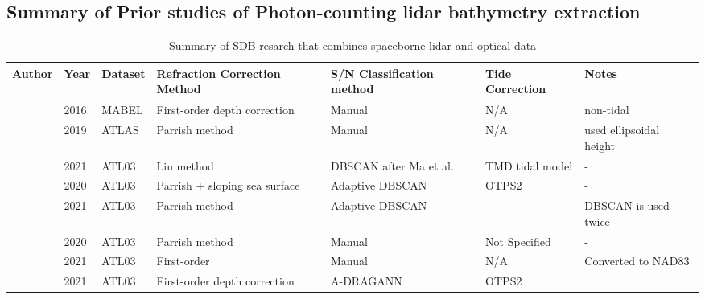 \subsection{Summary of Prior studies of Photon-counting lidar bathymetry extraction}
\begin{landscape}
      \begin{table}
            \caption{Summary of SDB resarch that combines spaceborne lidar and optical data}
            \raggedright
            \begin{tabular}{lllp{3cm}p{3cm}ll}
                  \midrule
                  Author                                               & Year & Dataset & Refraction Correction Method  & S/N Classification method      & Tide Correction & Notes                        \\
                  \hline
                  \citeauthor{Forfinski-Sarkozi2016} & 2016 & MABEL   & First-order depth correction  & Manual                         & N/A             & non-tidal                    \\
                  \citeauthor{Parrish2019}                    & 2019 & ATLAS   & Parrish method                & Manual                         & N/A             & used  ellipsoidal height     \\
                  \citeauthor{Liu2021}                             & 2021 & ATL03   & Liu method                    & DBSCAN after Ma et al.         & TMD tidal model & -                            \\
                  \citeauthor{Ma2020}                             & 2020 & ATL03   & Parrish + sloping sea surface & Adaptive DBSCAN                & OTPS2           & -                            \\
                  \citeauthor{Xie2021}                            & 2021 & ATL03   & Parrish method                & Adaptive DBSCAN                &                 & DBSCAN  is used twice        \\
                  \citeauthor{Thomas2021d}                     & 2020 & ATL03   & Parrish method                & Manual                         & Not Specified   & -                            \\
                  \citeauthor{Albright2021}             & 2021 & ATL03   & First-order                   & Manual                         & N/A             & Converted to NAD83           \\
                  \citeauthor{Cao2021}                            & 2021 & ATL03   & First-order depth correction  & A-DRAGANN                      & OTPS2           &                              \\

\end{tabular}
\end{table}
\end{landscape}
